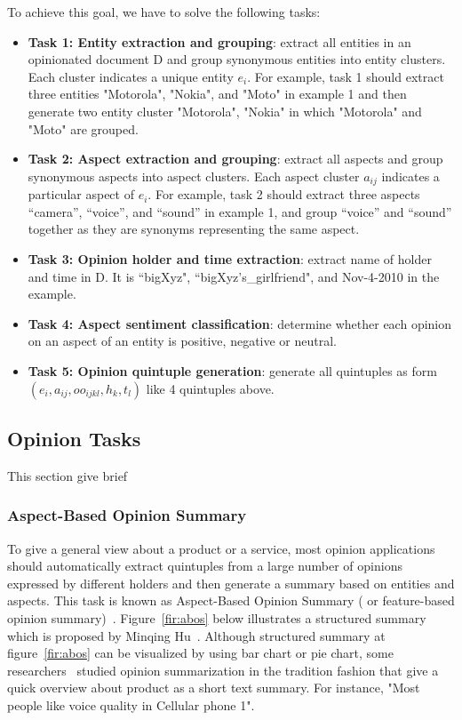 \documentclass{article}
\begin{document}
To achieve this goal, we have to solve the following tasks:
\begin{itemize}
	\item \textbf{Task 1: Entity extraction and grouping}: extract all entities in an opinionated document D and group synonymous entities into entity clusters. Each cluster indicates a unique entity $e_i$. For example, task 1 should extract three entities "Motorola", "Nokia", and "Moto" in example 1 and then generate two entity cluster "Motorola", "Nokia" in which "Motorola" and "Moto" are grouped.
	\item \textbf{Task 2: Aspect extraction and grouping}: extract all aspects and group synonymous aspects into aspect clusters. Each aspect cluster $a_{ij}$ indicates a particular aspect of $e_i$. For example, task 2 should extract three aspects “camera”, “voice”, and “sound” in example 1, and group “voice” and “sound” together as they are synonyms representing the same aspect.
	\item \textbf{Task 3: Opinion holder and time extraction}: extract name of holder and time in D. It is “bigXyz", “bigXyz's\_girlfriend", and Nov-4-2010 in the example.
	\item \textbf{Task 4: Aspect sentiment classification}: determine whether each opinion on an aspect of an entity is positive, negative or neutral. 
	\item \textbf{Task 5: Opinion quintuple generation}: generate all quintuples as form $(e_i, a_{ij}, oo_{ijkl}, h_k, t_l)$ like 4 quintuples above.
\end{itemize}


\subsection{Opinion Tasks}
This section give brief 
\subsubsection{Aspect-Based Opinion Summary}

To give a general view about a product or a service, most opinion applications should automatically extract quintuples from a large number of opinions expressed by different holders and then generate a summary based on entities and aspects.
This task is known as Aspect-Based Opinion Summary ( or feature-based opinion summary)~\cite{Hu:2004:MSC:1014052.1014073, Liu:2005:OOA:1060745.1060797}.
Figure~\ref{fir:abos} below illustrates a structured summary which is proposed by 	Minqing Hu~\cite{Hu:2004:MSC:1014052.1014073}. 
Although structured summary at figure~\ref{fir:abos} can be visualized by using bar chart or pie chart, some researchers~\cite{4,11,51,89,91} studied opinion summarization in the tradition fashion that give a quick overview about product as a short text summary. 
For instance, "Most people like voice quality in Cellular phone 1".
\end{document}
